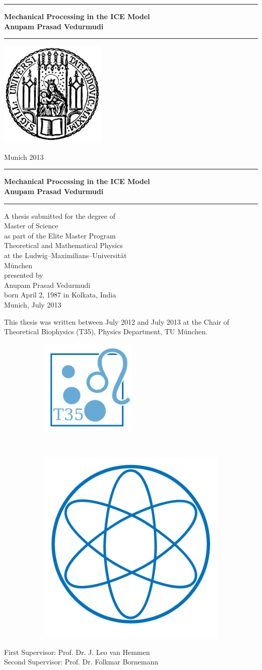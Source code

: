 \documentclass[12pt]{book}
\newcommand{\LMUTitle}[9]{
  \thispagestyle{empty}
  \vspace*{\stretch{1}}
  {\parindent0cm
   \rule{\linewidth}{.7ex}}
  \begin{flushright}

    \vspace*{\stretch{1}}
    \sffamily\bfseries\Huge
    #1\\
    \vspace*{\stretch{1}}
    \sffamily\bfseries\large
    #2
    \vspace*{\stretch{1}}
  \end{flushright}
  \rule{\linewidth}{.7ex}
  \vspace*{\stretch{5}}
  \begin{center}
    \includegraphics[width=2in]{siegel}
  \end{center}
  \vspace*{\stretch{1}}
  \begin{center}\sffamily\LARGE{#5}\end{center}
  \newpage
  \thispagestyle{empty}

  \cleardoublepage
  \thispagestyle{empty}

  \vspace*{\stretch{1}}
  {\parindent0cm
  \rule{\linewidth}{.7ex}}
  \begin{flushright}
    \vspace*{\stretch{1}}	
    \sffamily\bfseries\Huge
    #1\\
    \vspace*{\stretch{1}}
    \sffamily\bfseries\large
    #2
    \vspace*{\stretch{1}}
  \end{flushright}
  \rule{\linewidth}{.7ex}

  \vspace*{\stretch{3}}
  \begin{center}
      A thesis submitted for the degree of\\
      Master of Science\\
      as part of the Elite Master Program\\
      Theoretical and Mathematical Physics\\
      at the Ludwig--Maximilians--Universit\"{a}t\\
      M\"unchen\\
    \vspace*{\stretch{1}}
      presented by\\
      #2\\
      born April 2, 1987 in #3\\
    \vspace*{\stretch{2}}
      Munich, #6
  \end{center}

  \newpage
  \thispagestyle{empty}
  \noindent This thesis was written between July 2012 and July 2013 at the Chair of Theoretical Biophysics (T35), Physics Department, TU M\"{u}nchen.\\
  \vspace*{\stretch{1}}  
  \begin{figure}[htb!]
        \begin{subfigure}[b]{.5\textwidth}
         \flushleft
                \includegraphics[width=.3\textwidth]{Diagrams/T35logo2.png}
        \end{subfigure}%
        ~ %
        \begin{subfigure}[b]{0.5\textwidth}
        \flushright
                \includegraphics[width=.3\textwidth]{Diagrams/physik_logo2.png}
        \end{subfigure}
\end{figure}

  \begin{flushleft}
    \large First Supervisor:  #7 \\[1mm]
    \large Second Supervisor: #8 \\[1mm]
  \end{flushleft}

  \cleardoublepage
}
\begin{document}
  \frontmatter


  \LMUTitle
      {Mechanical Processing in the ICE Model
       }               %
      {Anupam Prasad Vedurmudi}                      %
      {Kolkata, India}                             %
      {Faculty of Physics}                         %
      {Munich 2013}                          %
      {July 2013}                            %
      {Prof. Dr. J. Leo van Hemmen}                          %
      {Prof. Dr. Folkmar Bornemann}                         %

 
 
 
 \cleardoublepage
 
 
 
  \tableofcontents


  \listoffigures


  \listoftables
  \cleardoublepage

  


  \mainmatter\setcounter{page}{1}
  
  
  
  
   

  
%  
 

  \backmatter
  
  \markboth{}{}

%  
%  
\end{document}
